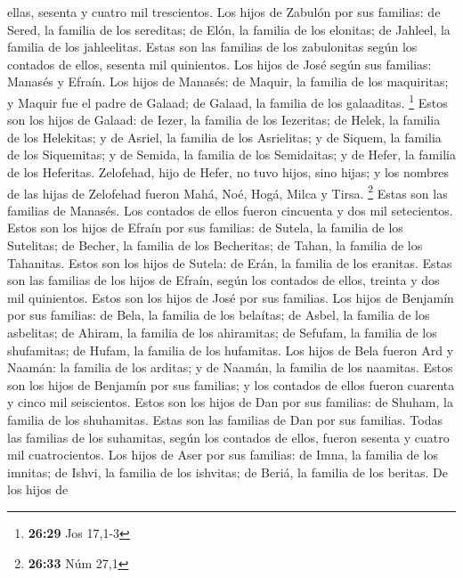 \begin{paracol}{2}
ellas, sesenta y cuatro mil trescientos.  Los hijos de
Zabulón por sus familias: de Sered, la familia de los sereditas; de
Elón, la familia de los elonitas; de Jahleel, la familia de los
jahleelitas.  Estas son las familias de los zabulonitas
según los contados de ellos, sesenta mil quinientos.  Los
hijos de José según sus familias: Manasés y Efraín.  Los
hijos de Manasés: de Maquir, la familia de los maquiritas; y Maquir fue
el padre de Galaad; de Galaad, la familia de los galaaditas. \footnote{\textbf{26:29}
  Jos 17,1-3}  Estos son los hijos de Galaad: de Iezer,
la familia de los Iezeritas; de Helek, la familia de los Helekitas;
 y de Asriel, la familia de los Asrielitas; y de Siquem,
la familia de los Siquemitas;  y de Semida, la familia de
los Semidaitas; y de Hefer, la familia de los Heferitas. 
Zelofehad, hijo de Hefer, no tuvo hijos, sino hijas; y los nombres de
las hijas de Zelofehad fueron Mahá, Noé, Hogá, Milca y Tirsa.
\footnote{\textbf{26:33} Núm 27,1}  Estas son las
familias de Manasés. Los contados de ellos fueron cincuenta y dos mil
setecientos.  Estos son los hijos de Efraín por sus
familias: de Sutela, la familia de los Sutelitas; de Becher, la familia
de los Becheritas; de Tahan, la familia de los Tahanitas.
 Estos son los hijos de Sutela: de Erán, la familia de
los eranitas.  Estas son las familias de los hijos de
Efraín, según los contados de ellos, treinta y dos mil quinientos. Estos
son los hijos de José por sus familias.  Los hijos de
Benjamín por sus familias: de Bela, la familia de los belaítas; de
Asbel, la familia de los asbelitas; de Ahiram, la familia de los
ahiramitas;  de Sefufam, la familia de los shufamitas; de
Hufam, la familia de los hufamitas.  Los hijos de Bela
fueron Ard y Naamán: la familia de los arditas; y de Naamán, la familia
de los naamitas.  Estos son los hijos de Benjamín por sus
familias; y los contados de ellos fueron cuarenta y cinco mil
seiscientos.  Estos son los hijos de Dan por sus
familias: de Shuham, la familia de los shuhamitas. Estas son las
familias de Dan por sus familias.  Todas las familias de
los suhamitas, según los contados de ellos, fueron sesenta y cuatro mil
cuatrocientos.  Los hijos de Aser por sus familias: de
Imna, la familia de los imnitas; de Ishvi, la familia de los ishvitas;
de Beriá, la familia de los beritas.  De los hijos de

\end{paracol}
